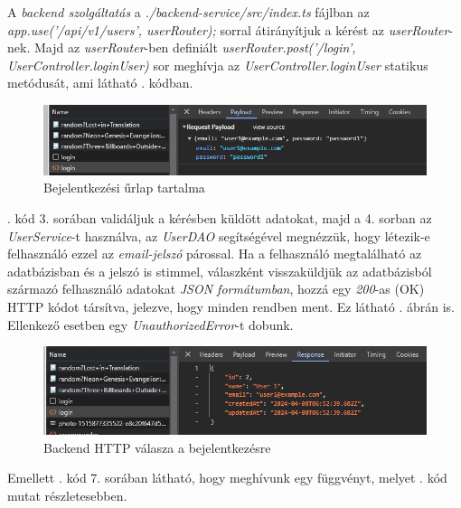 \documentclass[
]{thesis-ekf}
\theoremstyle{definition}
\theoremstyle{remark}
\begin{document}
A \emph{backend szolgáltatás} a \emph{./backend-service/src/index.ts} fájlban az \emph{app.use('/api/v1/users', userRouter);} sorral átirányítjuk a kérést az \emph{userRouter}-nek. Majd az \emph{userRouter}-ben definiált \emph{userRouter.post('/login', UserController.loginUser)} sor meghívja az \emph{UserController.loginUser} statikus metódusát, ami látható . kódban.



\begin{figure}[H]
	\centering
	\includegraphics[width=12cm]{images/frontend-login-network-payload.png}
	\caption[Bejelentkezési űrlap tartalma]{Bejelentkezési űrlap tartalma}
	\label{fig-sign-in-payload}
\end{figure}

. kód 3. sorában validáljuk a kérésben küldött adatokat, majd a 4. sorban az \emph{UserService}-t használva, az \emph{UserDAO} segítségével megnézzük, hogy létezik-e felhasználó ezzel az \emph{email-jelszó} párossal. Ha a felhasználó megtalálható az adatbázisban és a jelszó is stimmel, válaszként visszaküldjük az adatbázisból származó felhasználó adatokat \emph{JSON formátumban}, hozzá egy \emph{200}-as (OK) HTTP kódot társítva, jelezve, hogy minden rendben ment. Ez látható . ábrán is. Ellenkező esetben egy \emph{UnauthorizedError}-t dobunk. 

\begin{figure}[H]
	\centering
	\includegraphics[width=12cm]{images/frontend-login-3.png}
	\caption[Backend HTTP válasza a bejelentkezésre]{Backend HTTP válasza a bejelentkezésre}
	\label{fig-sign-in-response}
\end{figure}

Emellett . kód 7. sorában látható, hogy meghívunk egy függvényt, melyet . kód mutat részletesebben.
\end{document}

